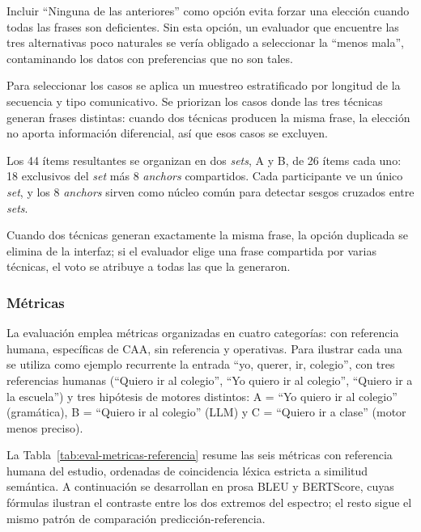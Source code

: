 Incluir ``Ninguna de las anteriores'' como opción evita forzar una elección cuando todas las frases son deficientes. Sin esta opción, un evaluador que encuentre las tres alternativas poco naturales se vería obligado a seleccionar la ``menos mala'', contaminando los datos con preferencias que no son tales.

Para seleccionar los casos se aplica un muestreo estratificado por longitud de la secuencia y tipo comunicativo. Se priorizan los casos donde las tres técnicas generan frases distintas: cuando dos técnicas producen la misma frase, la elección no aporta información diferencial, así que esos casos se excluyen.

Los 44 ítems resultantes se organizan en dos \textit{sets}, A y B, de 26 ítems cada uno: 18 exclusivos del \textit{set} más 8 \textit{anchors} compartidos. Cada participante ve un único \textit{set}, y los 8 \textit{anchors} sirven como núcleo común para detectar sesgos cruzados entre \textit{sets}.

Cuando dos técnicas generan exactamente la misma frase, la opción duplicada se elimina de la interfaz; si el evaluador elige una frase compartida por varias técnicas, el voto se atribuye a todas las que la generaron.

\subsubsection{Métricas}
\label{sec:metricas}

La evaluación emplea métricas organizadas en cuatro categorías: con referencia humana, específicas de CAA, sin referencia y operativas. Para ilustrar cada una se utiliza como ejemplo recurrente la entrada ``yo, querer, ir, colegio'', con tres referencias humanas (``Quiero ir al colegio'', ``Yo quiero ir al colegio'', ``Quiero ir a la escuela'') y tres hipótesis de motores distintos: A = ``Yo quiero ir al colegio'' (gramática), B = ``Quiero ir al colegio'' (LLM) y C = ``Quiero ir a clase'' (motor menos preciso).

La Tabla~\ref{tab:eval-metricas-referencia} resume las seis métricas con referencia humana del estudio, ordenadas de coincidencia léxica estricta a similitud semántica. A continuación se desarrollan en prosa BLEU y BERTScore, cuyas fórmulas ilustran el contraste entre los dos extremos del espectro; el resto sigue el mismo patrón de comparación predicción-referencia.

